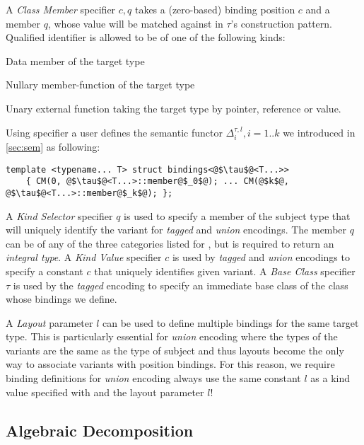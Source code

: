 A \emph{Class Member} specifier $c,q$\code{)} takes a (zero-based) binding 
position $c$ and a member $q$, whose value will be matched against in $\tau$'s 
construction pattern. Qualified identifier is allowed to be of one of the 
following kinds:

\begin{compactitem}
\setlength{\itemsep}{0pt}
\setlength{\parskip}{0pt}
\item Data member of the target type
\item Nullary member-function of the target type
\item Unary external function taking the target type by pointer, reference or value.
\end{compactitem}

\noindent
Using  specifier a user defines the semantic functor 
$\Delta_i^{\tau,l},i=1..k$ we introduced in \textsection\ref{sec:sem} as 
following:

\begin{lstlisting}[keepspaces]
template <typename... T> struct bindings<@$\tau$@<T...>> 
    { CM(0, @$\tau$@<T...>::member@$_0$@); ... CM(@$k$@, @$\tau$@<T...>::member@$_k$@); };
\end{lstlisting}

\noindent
A \emph{Kind Selector} specifier $q$\code{)} is used to specify a member 
of the subject type that will uniquely identify the variant for \emph{tagged} 
and \emph{union} encodings. The member $q$ can be of any of the three categories 
listed for , but is required to return an \emph{integral type}.
A \emph{Kind Value} specifier $c$\code{)} is used by \emph{tagged} and 
\emph{union} encodings to specify a constant $c$ that uniquely identifies given 
variant. 
A \emph{Base Class} specifier $\tau$\code{)} is used by the \emph{tagged}
encoding to specify an immediate base class of the class whose bindings we 
define.

A \emph{Layout} parameter $l$ can be used to define multiple bindings for the same 
target type. This is particularly essential for \emph{union} encoding where the 
types of the variants are the same as the type of subject and thus layouts 
become the only way to associate variants with position bindings. For this 
reason, we require binding definitions for \emph{union} encoding always use the 
same constant $l$ as a kind value specified with  and the layout 
parameter $l$!

\subsection{Algebraic Decomposition}
\label{sec:slv}

